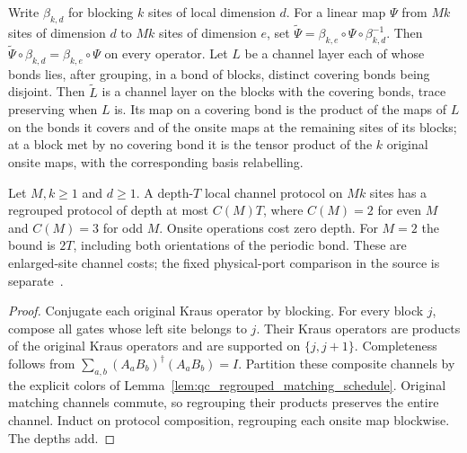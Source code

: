\begin{definition}
    \label{def:qc_regrouped_channel}
    \leanok
    Write $\beta_{k,d}$ for blocking $k$ sites of local dimension $d$.
    For a linear map $\Psi$ from $Mk$ sites of dimension $d$ to $Mk$ sites of
    dimension $e$, set $\widetilde\Psi=\beta_{k,e}\circ\Psi\circ\beta_{k,d}^{-1}$.
    Then $\widetilde\Psi\circ\beta_{k,d}=\beta_{k,e}\circ\Psi$ on every operator.
    Let $L$ be a channel layer each of whose bonds lies, after grouping, in a
    bond of blocks, distinct covering bonds being disjoint. Then $\widetilde L$ is
    a channel layer on the blocks with the covering bonds, trace preserving when
    $L$ is. Its map on a covering bond is the product of the maps of $L$ on the
    bonds it covers and of the onsite maps at the remaining sites of its blocks;
    at a block met by no covering bond it is the tensor product of the $k$
    original onsite maps, with the corresponding basis relabelling.
\end{definition}

\begin{lemma}
    \label{lem:qc_regrouped_protocol}
    \leanok
    Let $M,k\ge1$ and $d\ge1$. A depth-$T$ local channel protocol on $Mk$ sites
    has a regrouped protocol of depth at most $C(M)T$, where $C(M)=2$ for even
    $M$ and $C(M)=3$ for odd $M$. Onsite operations cost zero depth. For $M=2$
    the bound is $2T$, including both orientations of the periodic bond.
    These are enlarged-site channel costs; the fixed physical-port comparison in
    the source is separate~\cite[Appendix E]{Piroli2021LOCC}.
\end{lemma}
\begin{proof}
    \leanok
    Conjugate each original Kraus operator by blocking. For every block $j$,
    compose all gates whose left site belongs to $j$. Their Kraus operators are
    products of the original Kraus operators and are supported on $\{j,j+1\}$.
    Completeness follows from $\sum_{a,b}(A_aB_b)^\dagger(A_aB_b)=I$.
    Partition these composite channels by the explicit colors of
    Lemma~\ref{lem:qc_regrouped_matching_schedule}. Original matching channels
    commute, so regrouping their products preserves the entire channel.
    Induct on protocol composition, regrouping each onsite map blockwise.
    The depths add.
\end{proof}

